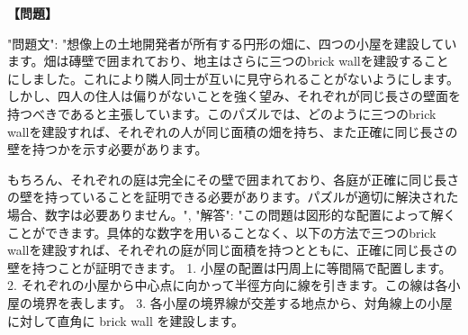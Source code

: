 \documentclass[10pt,a4paper,oneside,openany]{ltjsbook}
\begin{document}
\begin{tcolorbox}[colback=softblue,colframe=primaryblue,title=\textbf{第 194 問：THE GARDEN WALLS.},arc=2mm,boxrule=1pt,breakable]
\textbf{【問題】}\par\vspace{0.3em}
{
"問題文": "想像上の土地開発者が所有する円形の畑に、四つの小屋を建設しています。畑は磚壁で囲まれており、地主はさらに三つのbrick wallを建設することにしました。これにより隣人同士が互いに見守られることがないようにします。しかし、四人の住人は偏りがないことを強く望み、それぞれが同じ長さの壁面を持つべきであると主張しています。このパズルでは、どのように三つのbrick wallを建設すれば、それぞれの人が同じ面積の畑を持ち、また正確に同じ長さの壁を持つかを示す必要があります。

もちろん、それぞれの庭は完全にその壁で囲まれており、各庭が正確に同じ長さの壁を持っていることを証明できる必要があります。パズルが適切に解決された場合、数字は必要ありません。",
"解答": "この問題は図形的な配置によって解くことができます。具体的な数字を用いることなく、以下の方法で三つのbrick wallを建設すれば、それぞれの庭が同じ面積を持つとともに、正確に同じ長さの壁を持つことが証明できます。
1. 小屋の配置は円周上に等間隔で配置します。
2. それぞれの小屋から中心点に向かって半徑方向に線を引きます。この線は各小屋の境界を表します。
3. 各小屋の境界線が交差する地点から、対角線上の小屋に対して直角に brick wall を建設します。

}
\end{tcolorbox}
\end{document}
